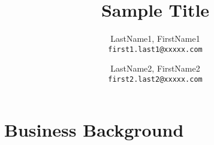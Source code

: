 \documentclass[10pt,letterpaper]{article}
\author{
	LastName1, FirstName1\\
	\texttt{first1.last1@xxxxx.com}
	\and
	LastName2, FirstName2\\
	\texttt{first2.last2@xxxxx.com}
}
\title{Sample Title}
\begin{document}
\section{Business Background}\label{section:business_background}
\end{document}
